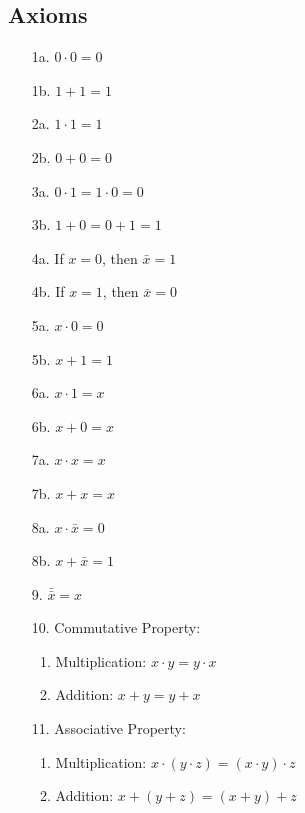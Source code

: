 \documentclass[12pt,openany]{book}
\begin{document}
			      	\subsection{Axioms}
			      	\begin{multicols}{2} %
			      		\begin{enumerate}
			      			\item[1a.] $0 \cdot 0 = 0$
			      			\item[1b.] $1 + 1 = 1$
			      			\item[2a.] $1 \cdot 1 = 1$
			      			\item[2b.] $0 + 0 = 0$
			      			\item[3a.] $0 \cdot 1 = 1 \cdot 0 = 0$
			      			\item[3b.] $1 + 0 = 0 + 1 = 1$
			      			\item[4a.] If $x = 0$, then $\bar{x} = 1$
			      			\item[4b.] If $x = 1$, then $\bar{x} = 0$
			      			\item[5a.] $x \cdot 0 = 0$
			      			\item[5b.] $x + 1 = 1$
			      			\item[6a.] $x \cdot 1 = x$
			      			\item[6b.] $x + 0 = x$
			      			\item[7a.] $x \cdot x = x$
			      			\item[7b.] $x + x = x$
			      			\item[8a.] $x \cdot \bar{x} = 0$
			      			\item[8b.] $x + \bar{x} = 1$
			      			\item[9.] $\bar{\bar{x}} = x$
			      			\item[10.] Commutative Property:
			      			      \begin{enumerate}
			      			      	\item Multiplication: \( x \cdot y = y \cdot x \)
			      			      	\item Addition: \( x + y = y + x \)
			      			      \end{enumerate}
                            \vspace*{60px} 
			      			\item[11.] Associative Property:
			      			      \begin{enumerate}
			      			      	\item Multiplication: \( x \cdot (y \cdot z) = (x \cdot y) \cdot z \)
			      			      	\item Addition: \( x + (y + z) = (x + y) + z \)

\end{enumerate}
\end{enumerate}
\end{multicols}
\end{document}
